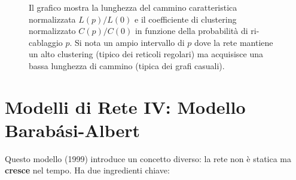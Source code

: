 \begin{figure}[htbp]
    \caption{Il grafico mostra la lunghezza del cammino caratteristica normalizzata $L(p)/L(0)$ e il coefficiente di clustering normalizzato $C(p)/C(0)$ in funzione della probabilità di ri-cablaggio $p$. Si nota un ampio intervallo di $p$ dove la rete mantiene un alto clustering (tipico dei reticoli regolari) ma acquisisce una bassa lunghezza di cammino (tipica dei grafi casuali).}
    \label{fig:watts_strogatz_chart}
\end{figure}

\newpage
\section{Modelli di Rete IV: Modello Barabási-Albert}
Questo modello (1999) introduce un concetto diverso: la rete non è statica ma \textbf{cresce} nel tempo. Ha due ingredienti chiave:

